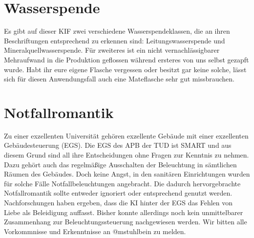 \section*{Wasserspende}
Es gibt auf dieser KIF zwei verschiedene Wasserspendeklassen, die an ihren Beschriftungen entsprechend zu erkennen sind: Leitungswasserspende und Mineralquellwasserspende.
Für zweiteres ist ein nicht vernachlässigbarer Mehraufwand in die Produktion geflossen während ersteres von uns selbst gezapft wurde. Habt ihr eure eigene Flasche
vergessen oder besitzt gar keine solche, lässt sich für diesen Anwendungsfall auch eine Mateflasche
sehr gut missbrauchen.

\section*{Notfallromantik}
Zu einer exzellenten Universität gehören exzellente Gebäude mit einer exzellenten Gebäudesteuerung
(EGS). Die EGS des APB der TUD ist SMART und aus diesem Grund sind all ihre Entscheidungen ohne
Fragen zur Kenntnis zu nehmen. Dazu gehört auch das regelmäßige Ausschalten der Beleuchtung in
sämtlichen Räumen des Gebäudes. Doch keine Angst, in den sanitären Einrichtungen wurden für solche
Fälle Notfallbeleuchtungen angebracht. Die dadurch hervorgebrachte Notfallromantik sollte entweder
ignoriert oder entsprechend genutzt werden. Nachforschungen haben ergeben, dass die KI hinter der
EGS das Fehlen von Liebe als Beleidigung auffasst. Bisher konnte allerdings noch kein unmittelbarer
Zusammenhang zur Beleuchtungssteuerung nachgewiesen werden. Wir bitten alle Vorkommnisse und
Erkenntnisse an @mstuhlbein zu melden.
